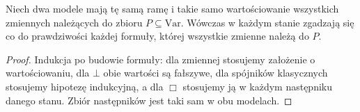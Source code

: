 \begin{lemat}
\label{lem:ncl-kripke-variable-dependence}
Niech dwa modele mają tę samą ramę i takie samo
wartościowanie wszystkich zmiennych należących
do zbioru $P\subseteq\mathrm{Var}$.
Wówczas w każdym stanie zgadzają się co do
prawdziwości każdej formuły, której wszystkie
zmienne należą do $P$.
\end{lemat}
\begin{proof}
Indukcja po budowie formuły:
dla zmiennej stosujemy założenie o wartościowaniu,
dla $\bot$ obie wartości są fałszywe,
dla spójników klasycznych stosujemy hipotezę
indukcyjną, a dla $\Box$ stosujemy ją
w każdym następniku danego stanu.
Zbiór następników jest taki sam w obu modelach.
\end{proof}

